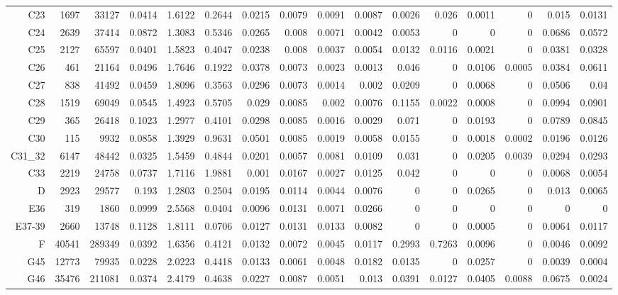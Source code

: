 \begin{table}[!htb]
{\begin{tabular}{rrrrrrrrrrrrrrrr}
C23 & 1697 & 33127 & 0.0414 & 1.6122 & 0.2644 & 0.0215 & 0.0079 & 0.0091 & 0.0087 & 0.0026 & 0.026 & 0.0011 & 0 & 0.015 & 0.0131 \\
C24 & 2639 & 37414 & 0.0872 & 1.3083 & 0.5346 & 0.0265 & 0.008 & 0.0071 & 0.0042 & 0.0053 & 0 & 0 & 0 & 0.0686 & 0.0572 \\
C25 & 2127 & 65597 & 0.0401 & 1.5823 & 0.4047 & 0.0238 & 0.008 & 0.0037 & 0.0054 & 0.0132 & 0.0116 & 0.0021 & 0 & 0.0381 & 0.0328 \\
C26 & 461 & 21164 & 0.0496 & 1.7646 & 0.1922 & 0.0378 & 0.0073 & 0.0023 & 0.0013 & 0.046 & 0 & 0.0106 & 0.0005 & 0.0384 & 0.0611 \\
C27 & 838 & 41492 & 0.0459 & 1.8096 & 0.3563 & 0.0296 & 0.0073 & 0.0014 & 0.002 & 0.0209 & 0 & 0.0068 & 0 & 0.0506 & 0.04 \\
C28 & 1519 & 69049 & 0.0545 & 1.4923 & 0.5705 & 0.029 & 0.0085 & 0.002 & 0.0076 & 0.1155 & 0.0022 & 0.0008 & 0 & 0.0994 & 0.0901 \\
C29 & 365 & 26418 & 0.1023 & 1.2977 & 0.4101 & 0.0298 & 0.0085 & 0.0016 & 0.0029 & 0.071 & 0 & 0.0193 & 0 & 0.0789 & 0.0845 \\
C30 & 115 & 9932 & 0.0858 & 1.3929 & 0.9631 & 0.0501 & 0.0085 & 0.0019 & 0.0058 & 0.0155 & 0 & 0.0018 & 0.0002 & 0.0196 & 0.0126 \\
C31\_32 & 6147 & 48442 & 0.0325 & 1.5459 & 0.4844 & 0.0201 & 0.0057 & 0.0081 & 0.0109 & 0.031 & 0 & 0.0205 & 0.0039 & 0.0294 & 0.0293 \\
C33 & 2219 & 24758 & 0.0737 & 1.7116 & 1.9881 & 0.001 & 0.0167 & 0.0027 & 0.0125 & 0.042 & 0 & 0 & 0 & 0.0068 & 0.0054 \\
D & 2923 & 29577 & 0.193 & 1.2803 & 0.2504 & 0.0195 & 0.0114 & 0.0044 & 0.0076 & 0 & 0 & 0.0265 & 0 & 0.013 & 0.0065 \\
E36 & 319 & 1860 & 0.0999 & 2.5568 & 0.0404 & 0.0096 & 0.0131 & 0.0071 & 0.0266 & 0 & 0 & 0 & 0 & 0 & 0 \\
E37-39 & 2660 & 13748 & 0.1128 & 1.8111 & 0.0706 & 0.0127 & 0.0131 & 0.0133 & 0.0082 & 0 & 0 & 0.0005 & 0 & 0.0064 & 0.0117 \\
F & 40541 & 289349 & 0.0392 & 1.6356 & 0.4121 & 0.0132 & 0.0072 & 0.0045 & 0.0117 & 0.2993 & 0.7263 & 0.0096 & 0 & 0.0046 & 0.0092 \\
G45 & 12773 & 79935 & 0.0228 & 2.0223 & 0.4418 & 0.0133 & 0.0061 & 0.0048 & 0.0182 & 0.0135 & 0 & 0.0257 & 0 & 0.0039 & 0.0004 \\
G46 & 35476 & 211081 & 0.0374 & 2.4179 & 0.4638 & 0.0227 & 0.0087 & 0.0051 & 0.013 & 0.0391 & 0.0127 & 0.0405 & 0.0088 & 0.0675 & 0.0024 \\

\end{tabular}}
\end{table}

